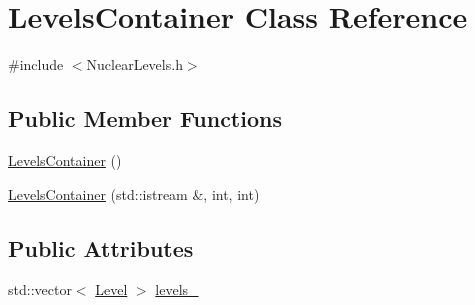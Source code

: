 \hypertarget{classLevelsContainer}{\section{Levels\-Container Class Reference}
\label{classLevelsContainer}
}


{\ttfamily \#include $<$Nuclear\-Levels.\-h$>$}

\subsection*{Public Member Functions}
\begin{DoxyCompactItemize}
\item 
\hyperlink{classLevelsContainer_a58e643cd8ba5a8a9b3c9c02d5b427781}{Levels\-Container} ()
\item 
\hyperlink{classLevelsContainer_a398a15211a87131c4418a8ab5b50e608}{Levels\-Container} (std\-::istream \&, int, int)
\end{DoxyCompactItemize}
\subsection*{Public Attributes}
\begin{DoxyCompactItemize}
\item 
std\-::vector$<$ \hyperlink{classLevel}{Level} $>$ \hyperlink{classLevelsContainer_a237727bb8b0c7f1a75701fde67d2094b}{levels\-\_\-}
\end{DoxyCompactItemize}


